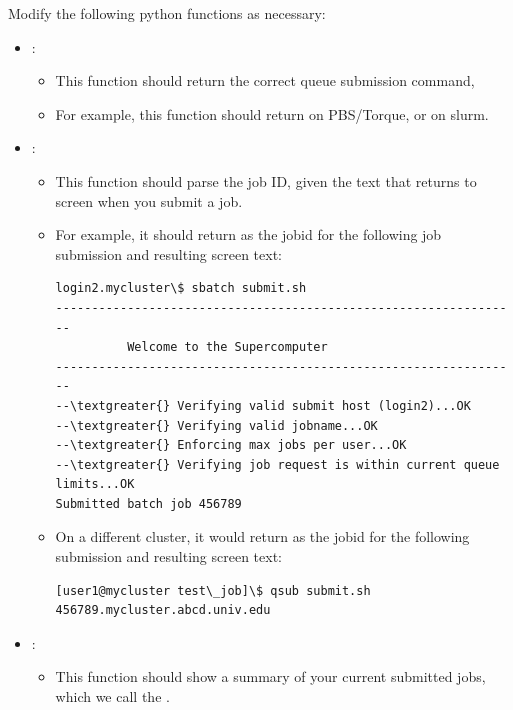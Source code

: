 \documentclass[letterpaper,10pt,english]{sphinxmanual}
\begin{document}
Modify the following python functions as necessary:
\begin{itemize}
\item {} 
:
\begin{itemize}
\item {} 
This function should return the correct queue submission command,

\item {} 
For example, this function should return  on PBS/Torque, or  on slurm.

\end{itemize}

\item {} 
:
\begin{itemize}
\item {} 
This function should parse the job ID, given the text that returns to screen when you submit a job.

\item {} 
For example, it should return  as the jobid for the following job submission and resulting screen text:

\begin{Verbatim}[commandchars=\\\{\}]
login2.mycluster\$ sbatch submit.sh
-----------------------------------------------------------------
          Welcome to the Supercomputer
-----------------------------------------------------------------
--\textgreater{} Verifying valid submit host (login2)...OK
--\textgreater{} Verifying valid jobname...OK
--\textgreater{} Enforcing max jobs per user...OK
--\textgreater{} Verifying job request is within current queue limits...OK
Submitted batch job 456789
\end{Verbatim}

\item {} 
On a different cluster, it would return  as the jobid for the following submission and resulting screen text:

\begin{Verbatim}[commandchars=\\\{\}]
[user1@mycluster test\_job]\$ qsub submit.sh
456789.mycluster.abcd.univ.edu
\end{Verbatim}

\end{itemize}

\item {} 
:
\begin{itemize}
\item {} 
This function should show a summary of your current submitted jobs, which we call the .


\end{itemize}
\end{itemize}
\end{document}

